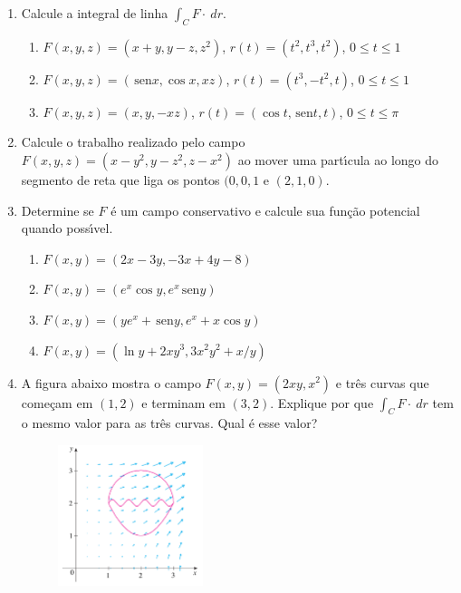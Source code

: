 \documentclass[a4paper,5pt]{amsbook}
\newcommand{\sen}{\,\mbox{sen}}
\begin{document}
\vspace{1cm}
\begin{enumerate}
    \setlength\itemsep{0.5cm}
    \item Calcule a integral de linha $\int_C F\cdot\ dr$.
        \begin{enumerate}
            \setlength\itemsep{0.3cm}
            \item $F(x,y,z) = (x+y, y-z, z^2)$, $r(t)=(t^2, t^3, t^2)$, $0\le
            t\le 1$
            \item $F(x,y,z) = (\sen{x}, \cos{x}, xz)$, $r(t)=(t^3,-t^2,t)$,
            $0\le t\le 1$
            \item $F(x,y,z) = (x, y, -xz)$, $r(t)=(\cos{t},\sen{t},t)$, $0\le
            t\le \pi$
         \end{enumerate}

    \item Calcule o trabalho realizado pelo campo $F(x,y,z) = (x-y^2, y-z^2,
    z-x^2)$ ao mover uma part\'{\i}cula ao longo do segmento de reta que liga os
    pontos $(0,0,1$ e $(2,1,0)$.

    \item Determine se $F$ \'e um campo conservativo e calcule sua fun\c{c}\~ao
    potencial quando poss\'{\i}vel.
        \begin{enumerate}
            \setlength\itemsep{0.3cm}
            \item $F(x,y) = (2x-3y, -3x+4y-8)$
            \item $F(x,y) = (e^x \cos{y}, e^x\sen{y})$
            \item $F(x,y) = (ye^x+\sen{y}, e^x+x\cos{y})$
            \item $F(x,y) = (\ln{y}+2xy^3, 3x^2y^2+x/y)$
        \end{enumerate}

    \item A figura abaixo mostra o campo $F(x,y) = (2xy,x^2)$ e tr\^es curvas que
    come\c{c}am em $(1,2)$ e terminam em $(3,2)$. Explique por que $\int_C F\cdot\
    dr$ tem o mesmo valor para as tr\^es curvas. Qual \'e esse valor?
    \begin{figure}[h]
        \centering
        \includegraphics[width=0.4\textwidth]{lista-12-fig1.png}
    \end{figure}


\end{enumerate}
\end{document}
